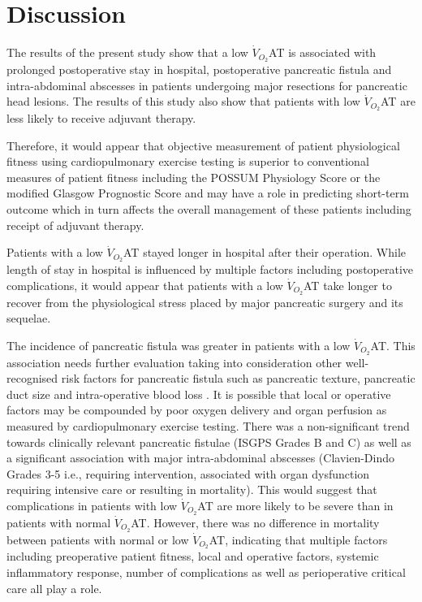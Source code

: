 

\clearpage

\section{Discussion}
The results of the present study show that a low $\dot{V}_{O_2}$AT is associated with prolonged postoperative stay in hospital, postoperative pancreatic fistula and intra-abdominal abscesses in patients undergoing major resections for pancreatic head lesions. 
The results of this study also show that patients with low $\dot{V}_{O_2}$AT are less likely to receive adjuvant therapy. 

Therefore, it would appear that objective measurement of patient physiological fitness using cardiopulmonary exercise testing is superior to conventional measures of patient fitness including the POSSUM Physiology Score or the modified Glasgow Prognostic Score and may have a role in predicting short-term outcome which in turn affects the overall management of these patients including receipt of adjuvant therapy.

Patients with a low $\dot{V}_{O_2}$AT stayed longer in hospital after their operation. 
While length of stay in hospital is influenced by multiple factors including postoperative complications, it would appear that patients with a low $\dot{V}_{O_2}$AT take longer to recover from the physiological stress placed by major pancreatic surgery and its sequelae.

The incidence of pancreatic fistula was greater in patients with a low $\dot{V}_{O_2}$AT. 
This association needs further evaluation taking into consideration other well-recognised risk factors for pancreatic fistula such as pancreatic texture, pancreatic duct size and intra-operative blood loss \parencite{braga_prognostic_2011, pratt_possum_2008, winter_1423_2006}. 
It is possible that local or operative factors may be compounded by poor oxygen delivery and organ perfusion as measured by cardiopulmonary exercise testing. 
There was a non-significant trend towards clinically relevant pancreatic fistulae (ISGPS Grades B and C) as well as a significant association with major intra-abdominal abscesses (Clavien-Dindo Grades 3-5 i.e., requiring intervention, associated with organ dysfunction requiring intensive care or resulting in mortality). 
This would suggest that complications in patients with low $\dot{V}_{O_2}$AT are more likely to be severe than in patients with normal $\dot{V}_{O_2}$AT. 
However, there was no difference in mortality between patients with normal or low $\dot{V}_{O_2}$AT, indicating that multiple factors including preoperative patient fitness, local and operative factors, systemic inflammatory response, number of complications as well as perioperative critical care all play a role.

